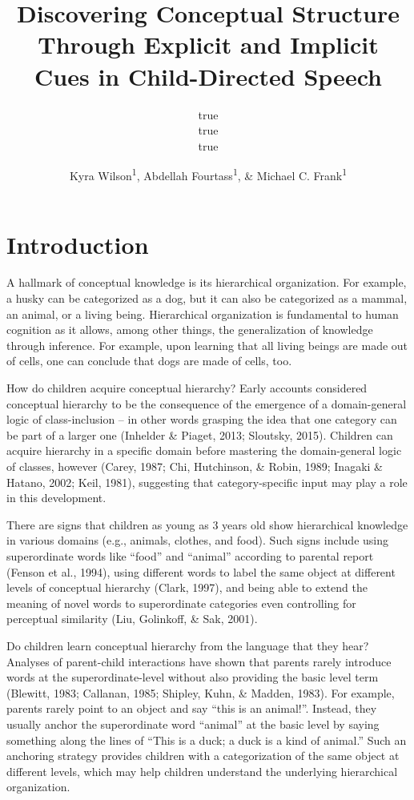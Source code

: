 \documentclass[english,,man,floatsintext]{apa6}
\title{Discovering Conceptual Structure Through Explicit and Implicit Cues in Child-Directed Speech}
\author{true \\ true \\ true}
\date{}
\author{Kyra Wilson\textsuperscript{1}, Abdellah Fourtass\textsuperscript{1}, \& Michael C. Frank\textsuperscript{1}}
\affiliation{
\vspace{0.5cm}
\textsuperscript{1} Department of Psychology, Stanford University}
\begin{document}
\maketitle

\hypertarget{introduction}{%
\section{Introduction}\label{introduction}}

A hallmark of conceptual knowledge is its hierarchical organization. For example, a husky can be categorized as a dog, but it can also be categorized as a mammal, an animal, or a living being. Hierarchical organization is fundamental to human cognition as it allows, among other things, the generalization of knowledge through inference. For example,
upon learning that all living beings are made out of cells, one can conclude that dogs are made of cells, too.

How do children acquire conceptual hierarchy? Early accounts considered
conceptual hierarchy to be the consequence of the emergence of a
domain-general logic of class-inclusion -- in other words grasping the idea that one category can be part of a larger one
(Inhelder \& Piaget, 2013; Sloutsky, 2015). Children can acquire hierarchy in a specific domain before mastering the domain-general logic of classes, however (Carey, 1987; Chi, Hutchinson, \& Robin, 1989; Inagaki \& Hatano, 2002; Keil, 1981), suggesting that category-specific input may play a role in this development.

There are signs that children as young as 3 years old show hierarchical knowledge in various domains (e.g., animals, clothes, and food). Such
signs include using superordinate words like \enquote{food} and \enquote{animal} according to parental report (Fenson et al., 1994), using different
words to label the same object at different levels of conceptual hierarchy (Clark, 1997), and being able to extend the meaning of novel words to superordinate categories even controlling for perceptual similarity (Liu, Golinkoff, \& Sak, 2001).

Do children learn conceptual hierarchy from the language that they hear? Analyses of parent-child interactions have shown that parents rarely introduce words at the
superordinate-level without also providing the basic level term (Blewitt, 1983; Callanan, 1985; Shipley, Kuhn, \& Madden, 1983). For example, parents rarely point to an object and say \enquote{this is an animal!}. Instead, they usually anchor the superordinate word \enquote{animal} at the basic level by saying something along the lines of \enquote{This is a duck; a duck is a kind of animal.} Such an anchoring strategy provides children with a categorization of the same object at different levels, which may help children understand the underlying hierarchical organization.
\end{document}

